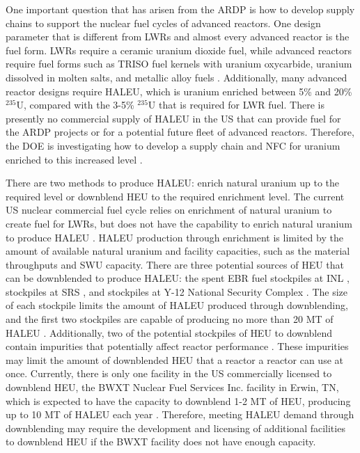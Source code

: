One important question that has arisen from the \gls{ARDP} is how to
develop supply chains to support the nuclear fuel cycles of 
advanced reactors. One design parameter that is different from \glspl{LWR} 
and almost every advanced reactor is the fuel form. \glspl{LWR} require 
a ceramic uranium dioxide fuel, while advanced reactors require fuel 
forms such as \gls{TRISO} fuel kernels with uranium oxycarbide, uranium 
dissolved in molten 
salts, and metallic alloy fuels \cite{hussain_advances_2018}.
Additionally, many advanced reactor designs require  
\acrfull{HALEU}, which is uranium enriched between 5\% and 20\% $^{235}$U,
compared with the 3-5\% $^{235}$U that is required for \gls{LWR} 
fuel. There is presently no commercial supply of \gls{HALEU} in the US that can 
provide fuel for the \gls{ARDP} projects or for a potential future fleet of 
advanced reactors. Therefore, the \gls{DOE} is investigating how to develop 
a supply chain and \gls{NFC} for uranium enriched to this 
increased level \cite{regalbuto_addressing_2020,dixon_estimated_2022}. 

There are two methods to produce \gls{HALEU}: enrich natural uranium up to 
the required level
or downblend \acrfull{HEU} to the required enrichment level. The current US
nuclear commercial fuel cycle relies on enrichment of natural uranium 
to create fuel for \glspl{LWR}, but does not have the capability to enrich
natural uranium to produce \gls{HALEU} \cite{nuclear_energy_institute_addressing_2018}.  
\gls{HALEU} production through enrichment is limited by
the amount of available natural uranium and facility capacities, such 
as the material throughputs and \acrfull{SWU} capacity.
There are three potential sources of \gls{HEU} that can be downblended 
to produce \gls{HALEU}: the spent \gls{EBR} fuel stockpiles at \gls{INL} 
\cite{patterson_haleu_2019}, stockpiles at \gls{SRS} \cite{regalbuto_addressing_2020}, 
and stockpiles at Y-12 National Security Complex 
\cite{robinson_establishment_2020}. The size of each stockpile limits the amount 
of \gls{HALEU} produced through downblending, and the first two stockpiles 
are capable of producing no more than 20 MT of \gls{HALEU}
\cite{regalbuto_addressing_2020}.
Additionally, two of the potential stockpiles of \gls{HEU} to downblend  
contain impurities that potentially affect reactor performance 
\cite{vaden_isotopic_2018,nelson_foreign_2010}.
These impurities may limit the amount of downblended \gls{HEU} that a reactor 
a reactor can use at once. 
Currently, there is only one facility in the US commercially licensed to 
downblend \gls{HEU}, the BWXT Nuclear Fuel Services Inc. facility in 
Erwin, TN, which is expected to have the capacity to downblend 1-2 
MT of \gls{HEU}, producing up to 10 MT of \gls{HALEU} each year \cite{nagley_ha-leu_2020}.
Therefore, meeting \gls{HALEU} demand through downblending may require the 
development and licensing of additional facilities to downblend \gls{HEU} if 
the BWXT facility does not have enough capacity. 

